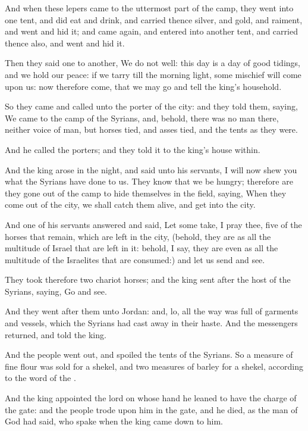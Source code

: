 \Verse And when these lepers came to the uttermost part of the camp, they went into one tent, and did eat and drink, and carried thence silver, and gold, and raiment, and went and hid it; and came again, and entered into another tent, and carried thence also, and went and hid it.

\Verse Then they said one to another, We do not well: this day is a day of good tidings, and we hold our peace: if we tarry till the morning light, some mischief will come upon us: now therefore come, that we may go and tell the king's household.

\Verse So they came and called unto the porter of the city: and they told them, saying, We came to the camp of the Syrians, and, behold, there was no man there, neither voice of man, but horses tied, and asses tied, and the tents as they were.

\Verse And he called the porters; and they told it to the king's house within.

\Verse And the king arose in the night, and said unto his servants, I will now shew you what the Syrians have done to us. They know that we be hungry; therefore are they gone out of the camp to hide themselves in the field, saying, When they come out of the city, we shall catch them alive, and get into the city.

\Verse And one of his servants answered and said, Let some take, I pray thee, five of the horses that remain, which are left in the city, (behold, they are as all the multitude of Israel that are left in it: behold, I say, they are even as all the multitude of the Israelites that are consumed:) and let us send and see.

\Verse They took therefore two chariot horses; and the king sent after the host of the Syrians, saying, Go and see.

\Verse And they went after them unto Jordan: and, lo, all the way was full of garments and vessels, which the Syrians had cast away in their haste. And the messengers returned, and told the king.

\Verse And the people went out, and spoiled the tents of the Syrians. So a measure of fine flour was sold for a shekel, and two measures of barley for a shekel, according to the word of the \LORD.

\Verse And the king appointed the lord on whose hand he leaned to have the charge of the gate: and the people trode upon him in the gate, and he died, as the man of God had said, who spake when the king came down to him.


